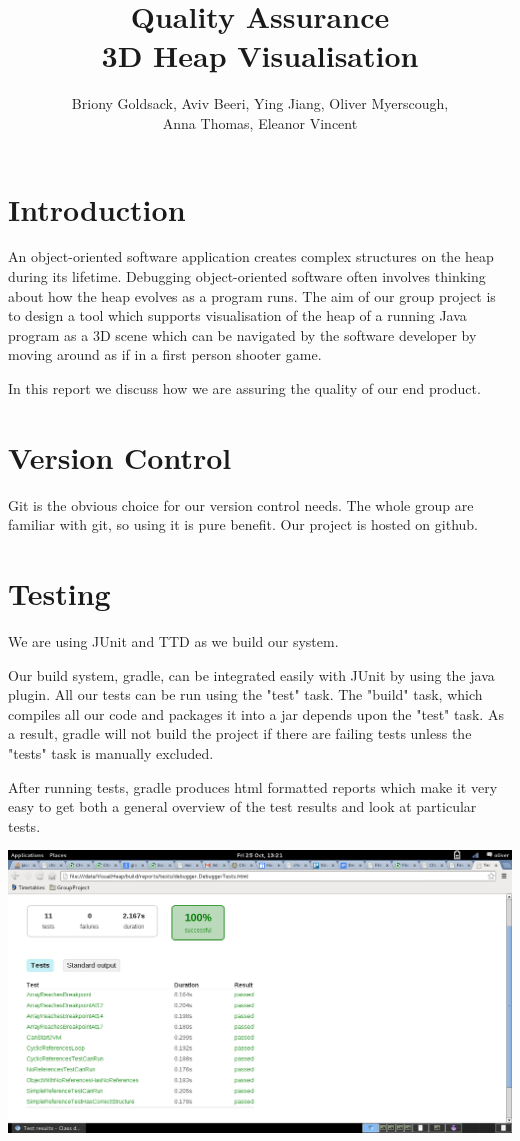 \documentclass[10pt, a4paper]{article}
\begin{document}
\title{Quality Assurance
\\ 3D Heap Visualisation}
\author{Briony Goldsack, Aviv Beeri, Ying Jiang, Oliver Myerscough, 
\\ Anna Thomas, Eleanor Vincent}
\maketitle

\section{Introduction} 
An object-oriented software application creates complex structures on the heap during its lifetime. Debugging object-oriented software often involves thinking about how the heap evolves as a program runs. The aim of our group project is to design a tool which supports visualisation of the heap of a running Java program as a 3D scene which can be navigated by the software developer by moving around as if in a first person shooter game. 

In this report we discuss how we are assuring the quality of our end product.

\section{Version Control}

Git is the obvious choice for our version control needs. The whole group are familiar with git, so using it is pure benefit. Our project is hosted on github. 

\section{Testing}

We are using JUnit and TTD as we build our system.

Our build system, gradle, can be integrated easily with JUnit by using the java plugin. All our tests can be run using the "test" task. The "build" task, which compiles all our code and packages it into a jar depends upon the "test" task. As a result, gradle will not build the project if there are failing tests unless the "tests" task is manually excluded.

After running tests, gradle produces html formatted reports which make it very easy to get both a general overview of the test results and look at particular tests.

\includegraphics[width=\textwidth]{images/testresults}

\begin{thebibliography}{9}


\end{thebibliography}
\end{document}
